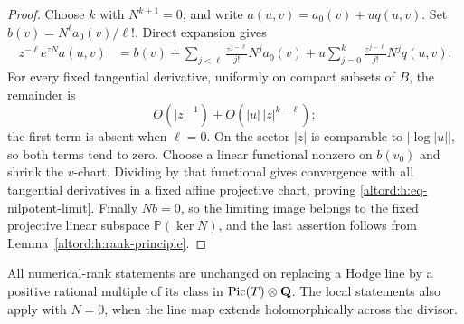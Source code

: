 \begin{proof}
Choose $k$ with $N^{k+1}=0$, and write
$a(u,v)=a_0(v)+u q(u,v)$. Set $b(v)=N^\ell a_0(v)/\ell!$.
Direct expansion gives
\begin{align*}
 z^{-\ell}e^{zN}a(u,v)
 &=b(v)+\sum_{j<\ell}\frac{z^{j-\ell}}{j!}N^ja_0(v)
       +u\sum_{j=0}^k\frac{z^{j-\ell}}{j!}N^jq(u,v).
\end{align*}
For every fixed tangential derivative, uniformly on compact subsets
of $B$, the remainder is
\[
 O(|z|^{-1})+O(|u|\,|z|^{k-\ell});
\]
the first term is absent when $\ell=0$.
On the sector $|z|$ is comparable to $|\log|u||$, so both terms tend
to zero. Choose a linear functional nonzero on $b(v_0)$ and shrink
the $v$-chart. Dividing by that functional gives convergence with
all tangential derivatives in a fixed affine projective chart,
proving \eqref{altord:h:eq-nilpotent-limit}. Finally $Nb=0$, so the limiting
image belongs to the fixed projective linear subspace
$\mathbb P(\ker N)$, and the last assertion follows from
Lemma~\ref{altord:h:rank-principle}.
\end{proof}

\begin{remark}\label{altord:h:scaling}
All numerical-rank statements are unchanged on replacing a Hodge line
by a positive rational multiple of its class in $\operatorname{Pic}(T)\otimes\mathbf Q$.
The local statements also apply with $N=0$, when the line map extends
holomorphically across the divisor.
\end{remark}
